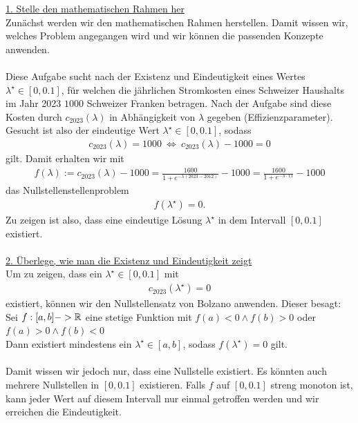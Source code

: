 \underline{1. Stelle den mathematischen Rahmen her}\\
Zunächst werden wir den mathematischen Rahmen herstellen. Damit wissen wir, welches Problem angegangen wird und wir können die passenden Konzepte anwenden.\\
\\
Diese Aufgabe sucht nach der Existenz und Eindeutigkeit eines Wertes $\lambda^\star \in [0,0.1]$, für welchen die jährlichen Stromkosten eines Schweizer Haushalts im Jahr 2023 $1000$ Schweizer Franken betragen.
Nach der Aufgabe sind diese Kosten durch $c_{2023}(\lambda)$ in Abhängigkeit von $\lambda$ gegeben (Effizienzparameter).
Gesucht ist also der eindeutige Wert $\lambda^\star \in [0,0.1]$, sodass 
\begin{align*}
	c_{2023}(\lambda) = 1000
	\ \Leftrightarrow \ 
	c_{2023}(\lambda) - 1000 = 0
\end{align*}
gilt. Damit erhalten wir mit 
\begin{align*}
	f(\lambda) := c_{2023}(\lambda) - 1000 
	=
	\frac{1600}{1 + e^{- \lambda (2023 - 2012)}} - 1000
	=
	\frac{1600}{1 + e^{- \lambda\cdot 11}} - 1000
\end{align*}
das Nullstellenstellenproblem
\begin{align*}
	f(\lambda^\star) = 0.
\end{align*}
Zu zeigen ist also, dass eine eindeutige Lösung $\lambda^\star$ in dem Intervall $[0, 0.1]$ existiert.\\
\\
\underline{2. Überlege, wie man die Existenz und Eindeutigkeit zeigt}\\
Um zu zeigen, dass ein $\lambda^\star  \in [0,0.1]$ mit
\begin{align*}
	c_{2023}(\lambda^\star) = 0
\end{align*}
existiert, können wir den Nullstellensatz von Bolzano anwenden. Dieser besagt:\\
Sei $f:[a,b] -> \mathbb{R}$ eine stetige Funktion mit $f(a) < 0 \wedge f(b) > 0 $ oder $f(a) > 0 \wedge f(b) < 0$\\
Dann existiert mindestens ein $\lambda^\star \in [a,b]$, sodass $f(\lambda^\star) = 0$ gilt.\\
\\
Damit wissen wir jedoch nur, dass eine Nullstelle existiert. Es könnten auch mehrere Nullstellen in $[0,0.1]$ existieren. 
Falls $f $ auf $[0,0.1]$ streng monoton ist, kann jeder Wert auf diesem Intervall nur einmal getroffen werden und wir erreichen die Eindeutigkeit.\\
